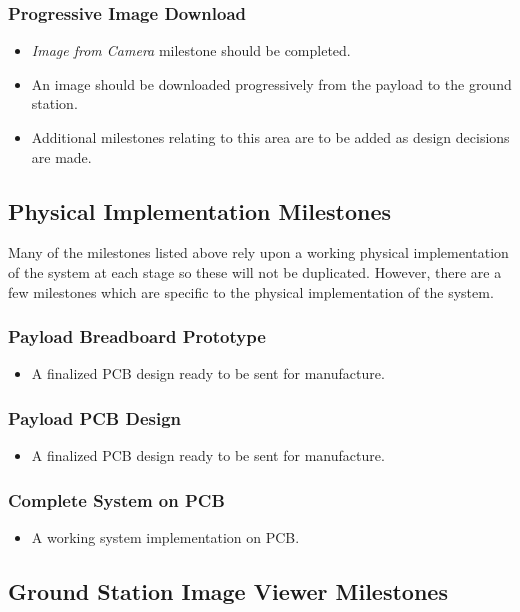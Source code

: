 	\subsubsection{Progressive Image Download}
		\begin{itemize}
			\item 	\emph{Image from Camera} milestone should be completed.
			\item 	An image should be downloaded progressively from the payload to the
				ground station.
			\item 	Additional milestones relating to this area are to be added as design decisions
				are made.
		\end{itemize}

\subsection{Physical Implementation Milestones}
Many of the milestones listed above rely upon a working physical implementation of the system at each stage
so these will not be duplicated. However, there are a few milestones which are specific to the physical implementation
of the system.



	\subsubsection{Payload Breadboard Prototype}
		\begin{itemize}
			\item A finalized PCB design ready to be sent for manufacture. 
		\end{itemize}

	\subsubsection{Payload PCB Design}
		\begin{itemize}
			\item A finalized PCB design ready to be sent for manufacture. 
		\end{itemize}
		
	\subsubsection{Complete System on PCB}
		\begin{itemize}
			\item A working system implementation on PCB.
		\end{itemize}


\subsection{Ground Station Image Viewer Milestones}

